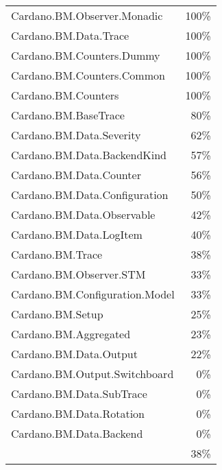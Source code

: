 \begin{tabular}{l r}
   Cardano.BM.Observer.Monadic & 100\% \\
   Cardano.BM.Data.Trace & 100\% \\
   Cardano.BM.Counters.Dummy & 100\% \\
   Cardano.BM.Counters.Common & 100\% \\
   Cardano.BM.Counters & 100\% \\
   Cardano.BM.BaseTrace & 80\% \\
   Cardano.BM.Data.Severity & 62\% \\
   Cardano.BM.Data.BackendKind & 57\% \\
   Cardano.BM.Data.Counter & 56\% \\
   Cardano.BM.Data.Configuration & 50\% \\
   Cardano.BM.Data.Observable & 42\% \\
   Cardano.BM.Data.LogItem & 40\% \\
   Cardano.BM.Trace & 38\% \\
   Cardano.BM.Observer.STM & 33\% \\
   Cardano.BM.Configuration.Model & 33\% \\
   Cardano.BM.Setup & 25\% \\
   Cardano.BM.Aggregated & 23\% \\
   Cardano.BM.Data.Output & 22\% \\
   Cardano.BM.Output.Switchboard & 0\% \\
   Cardano.BM.Data.SubTrace & 0\% \\
   Cardano.BM.Data.Rotation & 0\% \\
   Cardano.BM.Data.Backend & 0\% \\
    & 38\% \\
\end{tabular}
